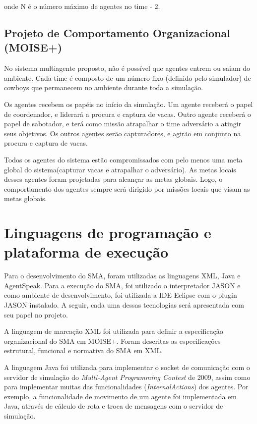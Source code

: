 \documentclass{llncs}
\begin{document}
onde N é o número máximo de agentes no time - 2.

\subsection{Projeto de Comportamento Organizacional (MOISE+)}

No sistema multiagente proposto, não é possível que agentes entrem ou saiam do ambiente. Cada time é composto de um número fixo (definido pelo simulador) de cowboys que permanecem no ambiente durante toda a simulação.

Os agentes recebem os papéis no início da simulação. Um agente receberá o papel de coordenador, e liderará a procura e captura de vacas. Outro agente receberá o papel de sabotador, e terá como missão atrapalhar o time adversário a atingir seus objetivos. Os outros agentes serão capturadores, e agirão em conjunto na procura e captura de vacas.

Todos os agentes do sistema estão compromissados com pelo menos uma meta global do sistema(capturar vacas e atrapalhar o adversário). As metas locais desses agentes foram projetadas para alcançar as metas globais. Logo, o comportamento dos agentes sempre será dirigido por missões locais que visam as metas globais.


\section{Linguagens de programação e plataforma de execução}


Para o desenvolvimento do SMA, foram utilizadas as linguagens XML, Java e AgentSpeak. Para a execução do SMA, foi utilizado o interpretador JASON e como ambiente de desenvolvimento, foi utilizada a IDE Eclipse com o plugin JASON instalado. A seguir, cada uma dessas tecnologias será apresentada com seu papel no projeto.

A linguagem de marcação XML foi utilizada para definir a especificação organizacional do SMA em MOISE+. Foram descritas as especificações estrutural, funcional e normativa do SMA em XML.

A linguagem Java foi utilizada para implementar o socket de comunicação com o servidor de simulação do \textit{Multi-Agent Programming Contest} de 2009, assim como para implementar muitas das funcionalidades (\textit{InternalActions}) dos agentes. Por exemplo, a funcionalidade de movimento de um agente foi implementada em Java, através de cálculo de rota e troca de mensagens com o servidor de simulação.
\end{document}
